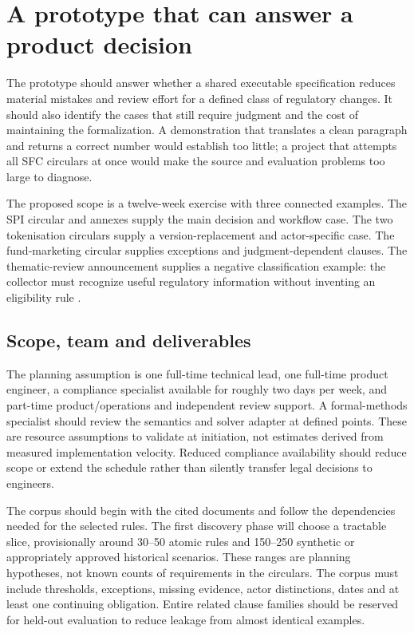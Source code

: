 \section{A prototype that can answer a product decision}
\label{sec:prototype}

The prototype should answer whether a shared executable specification reduces
material mistakes and review effort for a defined class of regulatory changes.
It should also identify the cases that still require judgment and the cost of
maintaining the formalization. A demonstration that translates a clean paragraph
and returns a correct number would establish too little; a project that attempts
all SFC circulars at once would make the source and evaluation problems too large
to diagnose.

The proposed scope is a twelve-week exercise with three connected examples. The
SPI circular and annexes supply the main decision and workflow case. The two
tokenisation circulars supply a version-replacement and actor-specific case.
The fund-marketing circular supplies exceptions and judgment-dependent clauses.
The thematic-review announcement supplies a negative classification example:
the collector must recognize useful regulatory information without inventing an
eligibility rule \citep{sfcspi,sfctoken2023,sfctoken2026,sfcmarketing,sfcreview2025}.

\subsection{Scope, team and deliverables}

The planning assumption is one full-time technical lead, one full-time product
engineer, a compliance specialist available for roughly two days per week, and
part-time product/operations and independent review support. A formal-methods
specialist should review the semantics and solver adapter at defined points.
These are resource assumptions to validate at initiation, not estimates derived
from measured implementation velocity. Reduced compliance availability should
reduce scope or extend the schedule rather than silently transfer legal decisions
to engineers.

The corpus should begin with the cited documents and follow the dependencies
needed for the selected rules. The first discovery phase will choose a tractable
slice, provisionally around 30--50 atomic rules and 150--250 synthetic or
appropriately approved historical scenarios. These ranges are planning hypotheses,
not known counts of requirements in the circulars. The corpus must include
thresholds, exceptions, missing evidence, actor distinctions, dates and at least
one continuing obligation. Entire related clause families should be reserved for
held-out evaluation to reduce leakage from almost identical examples.

